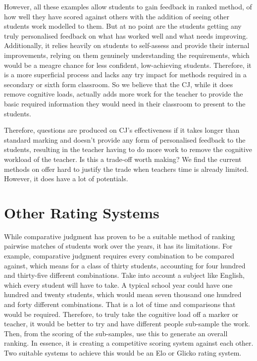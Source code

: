	However, all these examples allow students to gain feedback in ranked method, of how well they have scored against others with the addition of seeing other students work modelled to them. But at no point are the students getting any truly personalised feedback on what has worked well and what needs improving. Additionally, it relies heavily on students to self-assess and provide their internal improvements, relying on them genuinely understanding the requirements, which would be a meagre chance for less confident, low-achieving students. Therefore, it is a more superficial process and lacks any try impact for methods required in a secondary or sixth form classroom. So we believe that the CJ, while it does remove cognitive loads, actually adds more work for the teacher to provide the basic required information they would need in their classroom to present to the students. 
	
	Therefore, questions are produced on CJ's effectiveness if it takes longer than standard marking and doesn't provide any form of personalised feedback to the students, resulting in the teacher having to do more work to remove the cognitive workload of the teacher. Is this a trade-off worth making? We find the current methods on offer hard to justify the trade when teachers time is already limited. However, it does have a lot of potentials. %
		
	
	\section{Other Rating Systems}
	While comparative judgment has proven to be a suitable method of ranking pairwise matches of students work over the years, it has its limitations. For example, comparative judgment requires every combination to be compared against, which means for a class of thirty students, accounting for four hundred and thirty-five different combinations. Take into account a subject like English, which every student will have to take. A typical school year could have one hundred and twenty students, which would mean seven thousand one hundred and forty different combinations. That is a lot of time and comparisons that would be required. Therefore, to truly take the cognitive load off a marker or teacher, it would be better to try and have different people sub-sample the work. Then, from the scoring of the sub-samples, use this to generate an overall ranking. In essence, it is creating a competitive scoring system against each other. Two suitable systems to achieve this would be an Elo or Glicko rating system.
	

